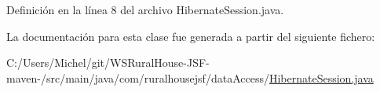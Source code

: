 Definición en la línea 8 del archivo Hibernate\+Session.\+java.



La documentación para esta clase fue generada a partir del siguiente fichero\+:\begin{DoxyCompactItemize}
\item 
C\+:/\+Users/\+Michel/git/\+W\+S\+Rural\+House-\/\+J\+S\+F-\/maven-\//src/main/java/com/ruralhousejsf/data\+Access/\mbox{\hyperlink{_hibernate_session_8java}{Hibernate\+Session.\+java}}\end{DoxyCompactItemize}

